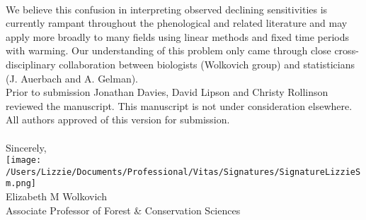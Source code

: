 \documentclass[11pt,a4paper]{article}
\begin{document}
\vspace{1.5ex}\\
We believe this confusion in interpreting observed declining sensitivities is currently rampant throughout the phenological \citep[e.g.,][]{fu2015,Samplonius:2018aa,vitasse2018,meng2020} and related literature \citep[e.g.,][]{piao2017} and may apply more broadly to many fields using linear methods and fixed time periods with warming. Our understanding of this problem only came through close cross-disciplinary collaboration between biologists (Wolkovich group) and statisticians (J. Auerbach and A. Gelman). 
\vspace{1.5ex}\\
Prior to submission Jonathan Davies, David Lipson and Christy Rollinson reviewed the manuscript. This manuscript is not under consideration elsewhere. All authors approved of this version for submission. \\ %
\vspace{1.5ex}\\
Sincerely,\\

\texttt{[image: /Users/Lizzie/Documents/Professional/Vitas/Signatures/SignatureLizzieSm.png]} \\

\noindent Elizabeth M Wolkovich\\
Associate Professor of Forest \& Conservation Sciences\\ 


\end{document}
